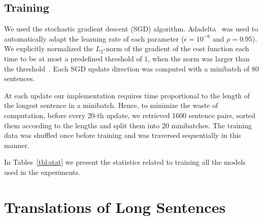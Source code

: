 \documentclass{article} %
\begin{document}
\subsection{Training}

We used the stochastic gradient descent (SGD) algorithm.
Adadelta~\citep{Zeiler2012} was used to automatically adapt the learning rate of
each parameter ($\epsilon=10^{-6}$ and $\rho=0.95$). We explicitly normalized
the $L_2$-norm of the gradient of the cost function each time to be at most a
predefined threshold of $1$, when the norm was larger than the
threshold~\citep{Pascanu2013}.  Each SGD update direction was computed with a
minibatch of 80 sentences. 

At each update our implementation requires time proportional to the length of
the longest sentence in a minibatch. Hence, to minimize the waste of
computation, before every 20-th update, we retrieved 1600 sentence pairs, sorted them
according to the lengths and split them into 20 minibatches. The training data
was shuffled once before training and was traversed sequentially in this manner.

In Tables~\ref{tbl:stat} we present the statistics related to training all the
models used in the experiments.


\section{Translations of Long Sentences}
\label{sec:long_translation}
\end{document}

